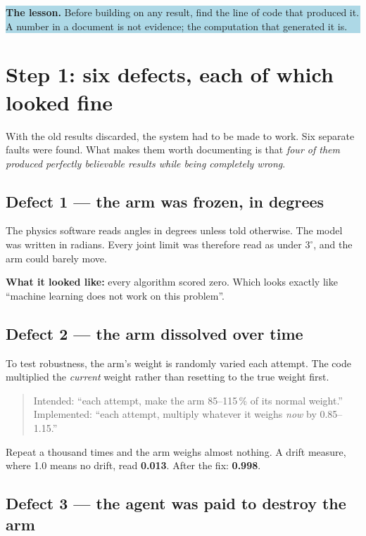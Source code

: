 \documentclass[11pt, a4paper]{article}
\newcommand{\lesson}[1]{%
  \par\vspace{4pt}%
  \noindent\colorbox{lightblue}{\parbox{\dimexpr\linewidth-2\fboxsep}{%
  \textbf{The lesson.} #1}}\par\vspace{4pt}}
\begin{document}
\lesson{Before building on any result, find the line of code that produced it.
A number in a document is not evidence; the computation that generated it is.}

\section{Step 1: six defects, each of which looked fine}

With the old results discarded, the system had to be made to work. Six separate
faults were found. What makes them worth documenting is that \emph{four of them
produced perfectly believable results while being completely wrong}.

\subsection{Defect 1 --- the arm was frozen, in degrees}

The physics software reads angles in degrees unless told otherwise. The model was
written in radians. Every joint limit was therefore read as under
$3^{\circ}$, and the arm could barely move.

\textbf{What it looked like:} every algorithm scored zero. Which looks exactly
like ``machine learning does not work on this problem''.

\subsection{Defect 2 --- the arm dissolved over time}

To test robustness, the arm's weight is randomly varied each attempt. The code
multiplied the \emph{current} weight rather than resetting to the true weight
first.

\begin{quote}
Intended: ``each attempt, make the arm 85--115\,\% of its normal weight.''\\
Implemented: ``each attempt, multiply whatever it weighs \emph{now} by
0.85--1.15.''
\end{quote}

Repeat a thousand times and the arm weighs almost nothing. A drift measure, where
1.0 means no drift, read \textbf{0.013}. After the fix: \textbf{0.998}.

\subsection{Defect 3 --- the agent was paid to destroy the arm}
\end{document}
